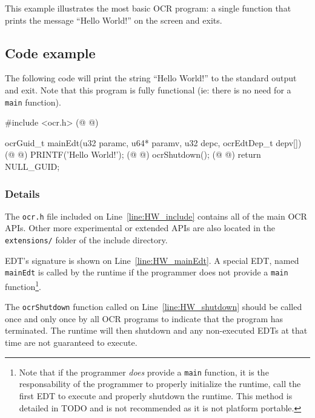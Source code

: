 This example illustrates the most basic OCR program: a single function
that prints the message ``Hello World!'' on the screen and exits.
\subsection{Code example}
The following code will print the string ``Hello World!'' to the
standard output and exit. Note that this program is fully functional
(ie: there is no need for a \texttt{main} function).

\begin{ocrsnip}
#include <ocr.h> (@ \label{line:HW_include} @)

ocrGuid_t mainEdt(u32 paramc, u64* paramv, u32 depc, ocrEdtDep_t depv[]) { (@ \label{line:HW_mainEdt} @)
    PRINTF('Hello World!\n'); (@ \label{line:HW_printf}@)
    ocrShutdown(); (@ \label{line:HW_shutdown}@)
    return NULL_GUID;
}
\end{ocrsnip}
\subsubsection{Details}
The \texttt{ocr.h} file included on Line~\ref{line:HW_include}
contains all of the main OCR APIs. Other more experimental or extended
APIs are also located in the \texttt{extensions/} folder of the
include directory.

EDT's signature is shown on Line~\ref{line:HW_mainEdt}. A special EDT,
named \texttt{mainEdt} is called by the runtime if the programmer does not
provide a \texttt{main} function\footnote{Note that if the programmer
  \emph{does} provide a \texttt{main} function, it is the
  responsability of the programmer to properly initialize the runtime,
  call the first EDT to execute and properly shutdown the runtime. This
  method is detailed in TODO and is not recommended as it is not
  platform portable.}.

The \texttt{ocrShutdown} function called on
Line~\ref{line:HW_shutdown} should be called once and only once by all
OCR programs to indicate that the program has terminated. The runtime
will then shutdown and any non-executed EDTs at that time are not
guaranteed to execute.